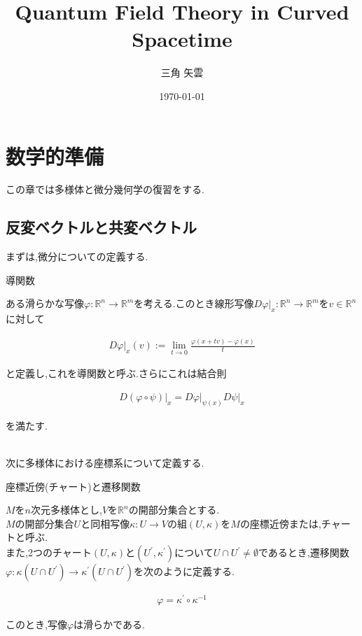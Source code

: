 \documentclass{jsarticle}
\title{Quantum Field Theory in Curved Spacetime}
\author{三角 矢雲}
\date{\today}
\begin{document}
\maketitle

\section{数学的準備}

この章では多様体と微分幾何学の復習をする.

\subsection{反変ベクトルと共変ベクトル}

まずは,微分についての定義する.

\begin{itembox}[l]{導関数}

ある滑らかな写像$\varphi:\mathbb{R}^n \to \mathbb{R}^m$を考える.このとき線形写像$D\varphi\rvert_x:\mathbb{R}^n \to \mathbb{R}^m$を$v \in \mathbb{R}^n$に対して

\begin{align}
D\varphi\rvert_x (v) :=\lim_{t \to 0} \frac{\varphi(x+tv) - \varphi(x)}{t}
\end{align}

と定義し,これを導関数と呼ぶ.さらにこれは結合則

\begin{align}
D(\varphi \circ \psi)\rvert_x = D\varphi\rvert_{\psi(x)}D\psi\rvert_x
\end{align}

を満たす.

\end{itembox}\\

次に多様体における座標系について定義する.

\begin{itembox}[l]{座標近傍(チャート)と遷移関数}

$M$を$n$次元多様体とし,$V$を$\mathbb{R}^n$の開部分集合とする.\\
$M$の開部分集合$U$と同相写像$\kappa:U \to V$の組$(U,\kappa)$を$M$の座標近傍または,チャートと呼ぶ.\\
また,2つのチャート$(U,\kappa)$と$(U^\prime,\kappa^\prime)$について$U \cap U^\prime \neq\emptyset$であるとき,遷移関数$\varphi:\kappa(U \cap U^\prime) \to \kappa^\prime(U \cap U^\prime)$を次のように定義する.

\begin{align}
\varphi = \kappa^\prime \circ \kappa^{-1}
\end{align}

このとき,写像$\varphi$は滑らかである.

\end{itembox}
\end{document}

